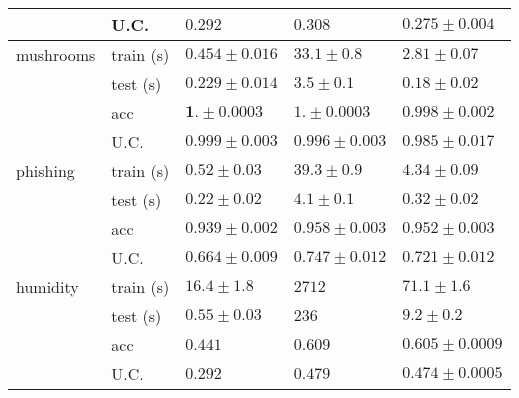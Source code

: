 \begin{tabular}{|ll|lll|}
 & U.C.      & $0.292$ & $\mathbf{0.308}$ & $       0.275\pm   0.004$\\
\hline
mushrooms & train (s) & $\mathbf{       0.454\pm    0.016}$ & $        33.1\pm     0.8$ & $        2.81\pm    0.07$\\
 & test (s)       & $       0.229\pm    0.014$ & $        3.5\pm      0.1$ & $\mathbf{       0.18\pm    0.02}$\\
 & acc       & $\mathbf{           1.\pm  0.0003}$ & $           1.\pm  0.0003$ & $       0.998\pm   0.002$\\
 & U.C.      & $\mathbf{       0.999\pm   0.003}$ & $       0.996\pm    0.003$ & $       0.985\pm    0.017$\\
\hline
phishing & train (s) & $\mathbf{       0.52\pm    0.03}$ & $        39.3\pm     0.9$ & $        4.34\pm    0.09$\\
	& test (s)       & $       \mathbf{0.22\pm    0.02}$ & $        4.1\pm     0.1$ & $0.32\pm    0.02$\\
 & acc       & $       0.939\pm   0.002$ & $\mathbf{       0.958\pm   0.003}$ & $       0.952\pm   0.003$\\
 & U.C.      & $0.664\pm   0.009$ & $\mathbf{0.747\pm    0.012}$ & $       0.721\pm    0.012$\\
\hline
humidity & train (s) & $\mathbf{        16.4\pm1.8}$ & $    2712$ & $        71.1\pm      1.6$\\
	& test (s)       & $\mathbf{0.55\pm0.03}$ & $         236$ & $9.2\pm      0.2$\\
 & acc       & $       0.441$ & $\mathbf{       0.609}$ & $       0.605\pm  0.0009$\\
 & U.C.      & $0.292$ & $\mathbf{0.479}$ & $       0.474\pm  0.0005$\\
\hline
\end{tabular}
